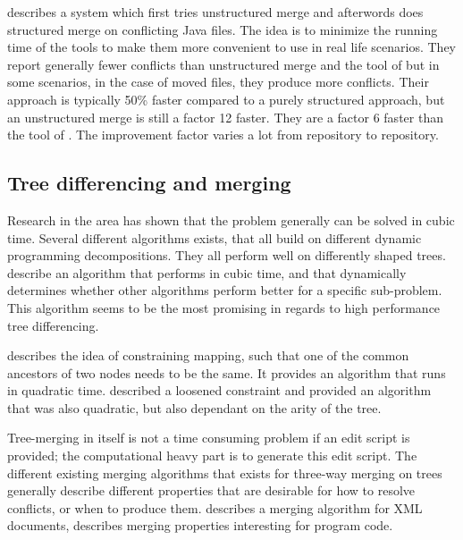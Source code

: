 \documentclass[11pt]{article}
\begin{document}
\citet{Olav} describes a system which first tries unstructured merge and afterwords does structured merge on conflicting Java files. The idea is to minimize the running time of the tools to make them more convenient to use in real life scenarios. They report generally fewer conflicts than unstructured merge and the tool of \citet{Apel} but in some scenarios, in the case of moved files, they produce more conflicts. Their approach is typically 50\% faster compared to a purely structured approach, but an unstructured merge is still a factor 12 faster. They are a factor 6 faster than the tool of \citet{Apel}. The improvement factor varies a lot from repository to repository.  

\subsection{Tree differencing and merging}
Research in the area has shown that the problem generally can be solved in cubic time. Several different algorithms exists, that all build on different dynamic programming decompositions. They all perform well on differently shaped trees. \citet{Pawlik} describe an algorithm that performs in cubic time, and that dynamically determines whether other algorithms perform better for a specific sub-problem. This algorithm seems to be the most promising in regards to high performance tree differencing.

\citet{Zhang} describes the idea of constraining mapping, such that one of the common ancestors of two nodes needs to be the same. It provides an algorithm that runs in quadratic time. \citet{Lu} described a loosened constraint and provided an algorithm that was also quadratic, but also dependant on the arity of the tree.

Tree-merging in itself is not a time consuming problem if an edit script is provided; the computational heavy part is to generate this edit script. The different existing merging algorithms that exists for three-way merging on trees generally describe different properties that are desirable for how to resolve conflicts, or when to produce them. \citet{lindholm} describes a merging algorithm for XML documents, \citet{Horwitz,Asklund,Olav} describes merging properties interesting for program code.

\clearpage
\end{document}
